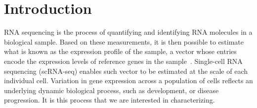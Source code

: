 \documentclass[pdflatex,sn-mathphys-num]{sn-jnl}%
\theoremstyle{thmstyleone}%
\theoremstyle{thmstyletwo}%
\theoremstyle{thmstylethree}%
\begin{document}
\section{Introduction}\label{sec:introduction}

RNA sequencing is the process of quantifying and identifying RNA molecules in a biological sample. Based on these measurements, it is then possible to estimate what is known as the expression profile of the sample, a vector whose entries encode the expression levels of reference genes in the sample~\cite{kukurba_rna_2015}. Single-cell RNA sequencing (scRNA-seq) enables such vector to be estimated at the scale of each individual cell. Variation in gene expression across a population of cells reflects an underlying dynamic biological process, such as development, or disease progression. It is this process that we are interested in characterizing. 
\end{document}
